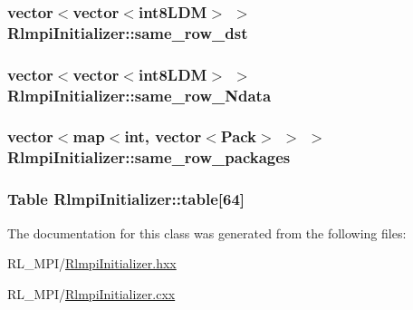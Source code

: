 \label{classRlmpiInitializer_aca6b4f6dcecf079c054faec1d043a884}
\hypertarget{classRlmpiInitializer_abe5095bd90a7f74d1bb8284098966fc9}{
\subsubsection[{same\_\-row\_\-dst}]{\setlength{\rightskip}{0pt plus 5cm}vector$<$vector$<${\bf int8LDM}$>$ $>$ {\bf RlmpiInitializer::same\_\-row\_\-dst}}}
\label{classRlmpiInitializer_abe5095bd90a7f74d1bb8284098966fc9}
\hypertarget{classRlmpiInitializer_a5349fc1c4ca51f739fb353ff6f422c4c}{
\subsubsection[{same\_\-row\_\-Ndata}]{\setlength{\rightskip}{0pt plus 5cm}vector$<$vector$<${\bf int8LDM}$>$ $>$ {\bf RlmpiInitializer::same\_\-row\_\-Ndata}}}
\label{classRlmpiInitializer_a5349fc1c4ca51f739fb353ff6f422c4c}
\hypertarget{classRlmpiInitializer_acb7c963b384be703536e9789d5a934da}{
\subsubsection[{same\_\-row\_\-packages}]{\setlength{\rightskip}{0pt plus 5cm}vector$<$map$<$int, vector$<$Pack$>$ $>$ $>$ {\bf RlmpiInitializer::same\_\-row\_\-packages}}}
\label{classRlmpiInitializer_acb7c963b384be703536e9789d5a934da}
\hypertarget{classRlmpiInitializer_a11c91777026788de0ec214104d18f4dd}{
\subsubsection[{table}]{\setlength{\rightskip}{0pt plus 5cm}Table {\bf RlmpiInitializer::table}\mbox{[}64\mbox{]}}}
\label{classRlmpiInitializer_a11c91777026788de0ec214104d18f4dd}


The documentation for this class was generated from the following files:\begin{DoxyCompactItemize}
\item 
RL\_\-MPI/\hyperlink{RlmpiInitializer_8hxx}{RlmpiInitializer.hxx}\item 
RL\_\-MPI/\hyperlink{RlmpiInitializer_8cxx}{RlmpiInitializer.cxx}\end{DoxyCompactItemize}

